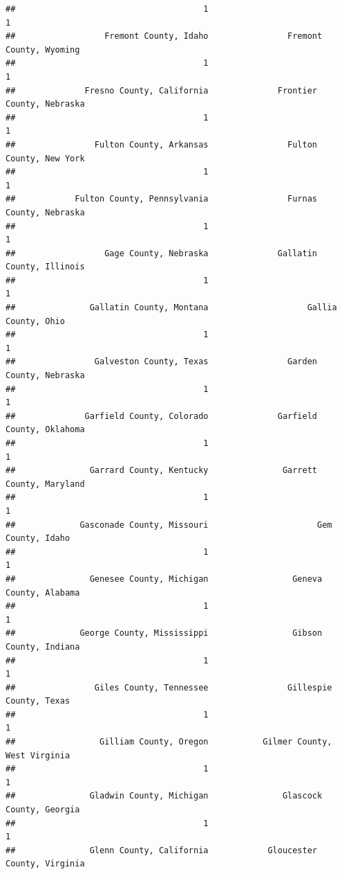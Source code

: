 \documentclass[
]{article}
\begin{document}
\begin{verbatim}
##                                      1                                      1 
##                  Fremont County, Idaho                Fremont County, Wyoming 
##                                      1                                      1 
##              Fresno County, California              Frontier County, Nebraska 
##                                      1                                      1 
##                Fulton County, Arkansas                Fulton County, New York 
##                                      1                                      1 
##            Fulton County, Pennsylvania                Furnas County, Nebraska 
##                                      1                                      1 
##                  Gage County, Nebraska              Gallatin County, Illinois 
##                                      1                                      1 
##               Gallatin County, Montana                    Gallia County, Ohio 
##                                      1                                      1 
##                Galveston County, Texas                Garden County, Nebraska 
##                                      1                                      1 
##              Garfield County, Colorado              Garfield County, Oklahoma 
##                                      1                                      1 
##               Garrard County, Kentucky               Garrett County, Maryland 
##                                      1                                      1 
##             Gasconade County, Missouri                      Gem County, Idaho 
##                                      1                                      1 
##               Genesee County, Michigan                 Geneva County, Alabama 
##                                      1                                      1 
##             George County, Mississippi                 Gibson County, Indiana 
##                                      1                                      1 
##                Giles County, Tennessee                Gillespie County, Texas 
##                                      1                                      1 
##                 Gilliam County, Oregon           Gilmer County, West Virginia 
##                                      1                                      1 
##               Gladwin County, Michigan               Glascock County, Georgia 
##                                      1                                      1 
##               Glenn County, California            Gloucester County, Virginia 

\end{verbatim}
\end{document}
